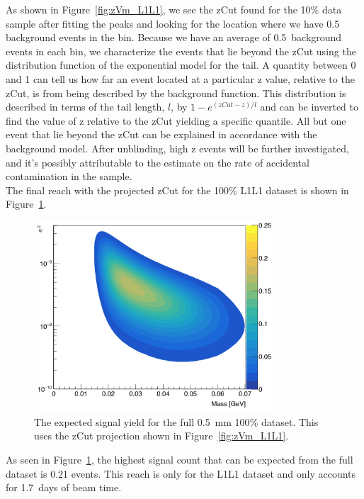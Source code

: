 As shown in Figure~\ref{fig:zVm_L1L1}, we see the zCut found for the 10$\%$ data sample after fitting the peaks and looking for the location where we have 0.5 background events in the bin. Because we have an average of 0.5~background events in each bin, we characterize the events that lie beyond the zCut using the distribution function of the exponential model for the tail. A quantity between 0 and 1 can tell us how far an event located at a particular z value, relative to the zCut, is from being described by the background function. This distribution is described in terms of the tail length, $l$, by $1-e^{(zCut - z)/l}$ and can be inverted to find the value of z relative to the zCut yielding a specific quantile. All but one event that lie beyond the zCut can be explained in accordance with the background model. After unblinding, high z events will be further investigated, and it's possibly attributable to the estimate on the rate of accidental contamination in the sample.\\

The final reach with the projected zCut for the 100$\%$ L1L1 dataset is shown in Figure~\ref{fig:zVm_reach}.

\begin{figure}[H]
  \centering
     \includegraphics[width=0.8\textwidth]{plots/reachL1L1.png}
  \caption{The expected signal yield for the full 0.5~mm 100$\%$ dataset. This uses the zCut projection shown in Figure~\ref{fig:zVm_L1L1}.}
  \label{fig:zVm_reach}
\end{figure} 

As seen in Figure~\ref{fig:zVm_reach}, the highest signal count that can be expected from the full dataset is 0.21 events. This reach is only for the L1L1 dataset and only accounts for 1.7~days of beam time. 
